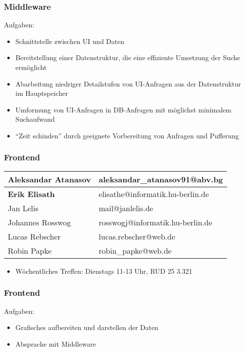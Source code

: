 \documentclass{beamer}
\begin{document}
\begin{frame}
	\frametitle{Middleware}
	Aufgaben:
	\begin{itemize}
		\item Schnittstelle zwischen UI und Daten
		\item Bereitstellung einer Datenstruktur, die eine effiziente Umsetzung der Suche ermöglicht
		\item Abarbeitung niedriger Detailstufen von UI-Anfragen aus der Datenstruktur im Hauptspeicher
		\item Umformung von UI-Anfragen in DB-Anfragen mit möglichst minimalem Suchaufwand
		\item \enquote{Zeit schinden} durch geeignete Vorbereitung von Anfragen und Pufferung
	\end{itemize}
\end{frame}

\begin{frame}
	\frametitle{Frontend}
	\begin{center}
		\begin{tabular}{|l|l|}
			\hline
			Aleksandar Atanasov & aleksandar\_atanasov91@abv.bg\\
			\hline
			\textbf{Erik Elisath} & elisathe@informatik.hu-berlin.de\\
			\hline
			Jan Lelis & mail@janlelis.de\\
			\hline
			Johannes Rosswog & rosswogj@informatik.hu-berlin.de\\
			\hline
			Lucas Rebscher & lucas.rebscher@web.de\\
			\hline
			Robin Papke	& robin\_papke@web.de\\
			\hline
		\end{tabular}
	\end{center}
	\begin{itemize}
		\item Wöchentliches Treffen: Dienstags 11-13 Uhr, RUD 25 3.321
	\end{itemize}
\end{frame}

\begin{frame}
	\frametitle{Frontend}
	Aufgaben:
	\begin{itemize}
		\item Grafisches aufbereiten und darstellen der Daten
		\item Absprache mit Middleware
	\end{itemize}
\end{frame}
\end{document}
